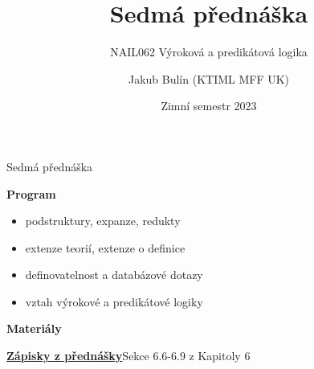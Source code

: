 \documentclass{beamer}
\title{Sedmá přednáška}
\subtitle{NAIL062 Výroková a predikátová logika}
\author{Jakub Bulín (KTIML MFF UK)}
\date{Zimní semestr 2023}
\begin{document}
\frame{\titlepage}


\begin{frame}{Sedmá přednáška}

    \textbf{Program}
        \begin{itemize}
            \item podstruktury, expanze, redukty           
            \item extenze teorií, extenze o definice
            \item definovatelnost a databázové dotazy
            \item vztah výrokové a predikátové logiky
        \end{itemize}

    \textbf{Materiály}

        \href{https://github.com/jbulin-mff-uk/nail062/raw/main/lecture/lecture-notes/lecture-notes.pdf}{\alert{\textbf{Zápisky z přednášky}}}Sekce 6.6-6.9 z Kapitoly 6

\end{frame}
\end{document}
